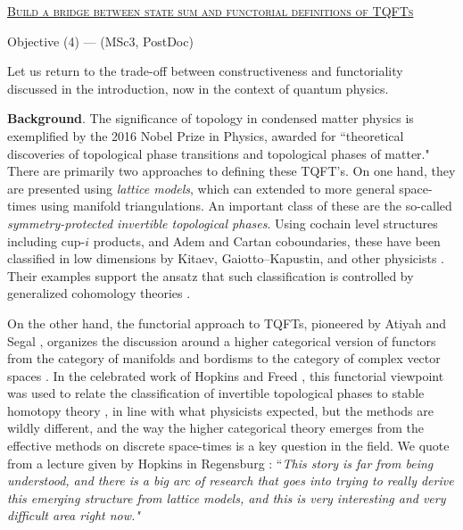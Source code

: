 
\smallskip
{\centering \underline{\textsc{Build a bridge between state sum and functorial definitions of TQFTs}}\par}
{\centering Objective (4) \hspace*{2cm} --- \hspace*{2cm} (MSc3, PostDoc)\par}

\medskip Let us return to the trade-off between constructiveness and functoriality discussed in the introduction, now in the context of quantum physics.

\smallskip\noindent\textbf{Background}.
The significance of topology in condensed matter physics is exemplified by the 2016 Nobel Prize in Physics, awarded for ``theoretical discoveries of topological phase transitions and topological phases of matter."
There are primarily two approaches to defining these TQFT's.
On one hand, they are presented using \textit{lattice models}, which can extended to more general space-times using manifold triangulations.
An important class of these are the so-called \textit{symmetry-protected invertible topological phases}.
Using cochain level structures including cup-$i$ products, and Adem and Cartan coboundaries, these have been classified in low dimensions by Kitaev, Gaiotto--Kapustin, and other physicists \cite{kitaev2009periodic, kapustin2015cobordism, barkeshli2022classification}.
Their examples support the ansatz that such classification is controlled by generalized cohomology theories \cite{adams1995stable}.

\quad On the other hand, the functorial approach to TQFTs, pioneered by Atiyah and Segal \cite{atiyah1988tqft}, organizes the discussion around a higher categorical version of functors from the category of manifolds and bordisms to the category of complex vector spaces \cite{baez1995higher}.
In the celebrated work of Hopkins and Freed \cite{freed2021reflection}, this functorial viewpoint was used to relate the classification of invertible topological phases to stable homotopy theory \cite{freed2021reflection}, in line with what physicists expected, but the methods are wildly different, and the way the higher categorical theory emerges from the effective methods on discrete space-times is a key question in the field.
We quote from a lecture given by Hopkins in Regensburg \cite{hopkins2023higher}:
``\textit{This story is far from being understood, and there is a big arc of research that goes into trying to really derive this emerging structure from lattice models, and this is very interesting and very difficult area right now."}

